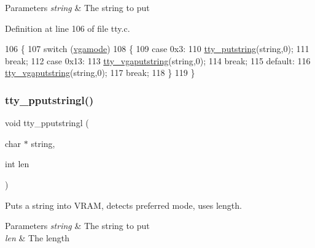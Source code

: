 \begin{DoxyParams}{Parameters}
{\em string} & The string to put \\
\hline
\end{DoxyParams}


Definition at line 106 of file tty.\+c.


\begin{DoxyCode}
106                                   \{
107     \textcolor{keywordflow}{switch} (\hyperlink{a00173_af93b0649fdd1bea5b6d29ed37205aa2c_af93b0649fdd1bea5b6d29ed37205aa2c}{vgamode})
108     \{
109     \textcolor{keywordflow}{case} 0x3:
110         \hyperlink{a00173_a5b5bf610a57f3c59b2851fa2652081ec_a5b5bf610a57f3c59b2851fa2652081ec}{tty\_putstring}(\textcolor{keywordtype}{string},0);
111         \textcolor{keywordflow}{break};
112     \textcolor{keywordflow}{case} 0x13:
113         \hyperlink{a00173_a05ca3f5e64f38fec173b635ca8465415_a05ca3f5e64f38fec173b635ca8465415}{tty\_vgaputstring}(\textcolor{keywordtype}{string},0);
114         \textcolor{keywordflow}{break};
115     \textcolor{keywordflow}{default}:
116         \hyperlink{a00173_a05ca3f5e64f38fec173b635ca8465415_a05ca3f5e64f38fec173b635ca8465415}{tty\_vgaputstring}(\textcolor{keywordtype}{string},0);
117         \textcolor{keywordflow}{break};
118     \}
119 \}
\end{DoxyCode}
\mbox{\label{a00173_abaf93f9e56ddb7b10462070f59e534e4_abaf93f9e56ddb7b10462070f59e534e4}} 
\subsubsection{\texorpdfstring{tty\+\_\+pputstringl()}{tty\_pputstringl()}}
{\footnotesize\ttfamily void tty\+\_\+pputstringl (\begin{DoxyParamCaption}\item[{char $\ast$}]{string,  }\item[{int}]{len }\end{DoxyParamCaption})}



Puts a string into V\+R\+AM, detects preferred mode, uses length. 


\begin{DoxyParams}{Parameters}
{\em string} & The string to put \\
\hline
{\em len} & The length \\
\hline
\end{DoxyParams}


